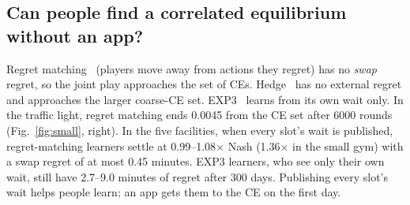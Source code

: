 \documentclass{article}
\begin{document}
\subsection{Can people find a correlated equilibrium without an app?}\label{sec:learn}
Regret matching~\cite{hart} (players move away from actions they regret) has no \emph{swap} regret, so the joint
play approaches the set of CEs. Hedge~\cite{freund} has no external regret and approaches the larger coarse-CE set.
EXP3~\cite{auer} learns from its own wait only. In the traffic light, regret matching ends 0.0045 from the CE set
after 6000 rounds (Fig.~\ref{fig:small}, right). In the five facilities, when every slot's wait is published,
regret-matching learners settle at 0.99--1.08$\times$ Nash (1.36$\times$ in the small gym) with a swap regret of at
most 0.45 minutes. EXP3 learners, who see only their own wait, still have 2.7--9.0 minutes of regret after 300 days.
Publishing every slot's wait helps people learn; an app gets them to the CE on the first day.

\end{document}
